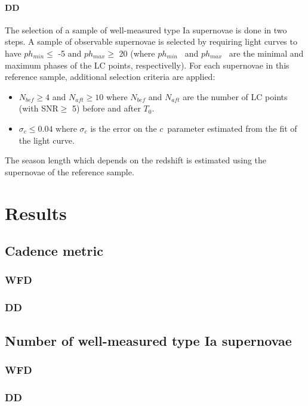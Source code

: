 \documentclass [11pt,a4paper]{article}
\newcommand{\sncolor}{$c$}
\newcommand{\daymax}{$T_0$}
\newcommand{\phasemin}{$ph_{min}$}
\newcommand{\phasemax}{$ph_{max}$}
\begin{document}
\paragraph{ DD}
The selection of a sample of well-measured type Ia supernovae is done in two steps. A sample of observable supernovae is selected by requiring light curves to have \phasemin $\leq$ -5 and \phasemax $\geq$ 20 (where \phasemin~ and \phasemax~ are the minimal and maximum phases of the LC points, respectivelly). For each supernovae in this reference sample, additional selection criteria are applied:
\begin{itemize}
\item $N_{bef} \geq 4$ and $N_{aft} \geq 10$ where $N_{bef}$ and $N_{aft}$ are the number of LC points (with SNR$\geq$ 5) before and after \daymax.
 \item $\sigma_c \leq 0.04$ where $\sigma_c$ is the error on the \sncolor~parameter estimated from the fit of the light curve.
\end{itemize}
The season length which depends on the redshift is estimated using the supernovae of the reference sample. 

\section{ Results}

\subsection{ Cadence metric }

\subsubsection{ WFD}

\subsubsection{ DD}

\subsection{ Number of well-measured type Ia supernovae}

\subsubsection {WFD}

\subsubsection{ DD}
\end{document}
